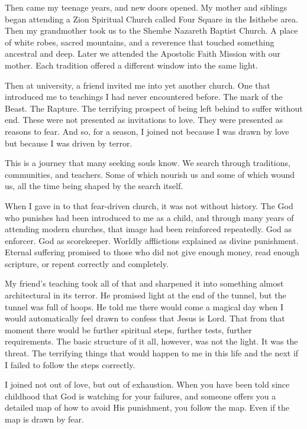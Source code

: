 Then came my teenage years, and new doors opened. My mother and siblings
began attending a Zion Spiritual Church called Four Square in the
Isithebe area. Then my grandmother took us to the Shembe Nazareth
Baptist Church. A place of white robes, sacred mountains, and a
reverence that touched something ancestral and deep. Later we attended
the Apostolic Faith Mission with our mother. Each tradition offered a
different window into the same light.

Then at university, a friend invited me into yet another church. One
that introduced me to teachings I had never encountered before. The mark
of the Beast. The Rapture. The terrifying prospect of being left behind
to suffer without end. These were not presented as invitations to love.
They were presented as reasons to fear. And so, for a season, I joined
not because I was drawn by love but because I was driven by terror.

This is a journey that many seeking souls know. We search through
traditions, communities, and teachers. Some of which nourish us and some
of which wound us, all the time being shaped by the search itself.

When I gave in to that fear-driven church, it was not without history.
The God who punishes had been introduced to me as a child, and through
many years of attending modern churches, that image had been reinforced
repeatedly. God as enforcer. God as scorekeeper. Worldly afflictions
explained as divine punishment. Eternal suffering promised to those who
did not give enough money, read enough scripture, or repent correctly
and completely.

My friend's teaching took all of that and sharpened it into something
almost architectural in its terror. He promised light at the end of the
tunnel, but the tunnel was full of hoops. He told me there would come a
magical day when I would automatically feel drawn to confess that Jesus
is Lord. That from that moment there would be further spiritual steps,
further tests, further requirements. The basic structure of it all,
however, was not the light. It was the threat. The terrifying things
that would happen to me in this life and the next if I failed to follow
the steps correctly.

I joined not out of love, but out of exhaustion. When you have been told
since childhood that God is watching for your failures, and someone
offers you a detailed map of how to avoid His punishment, you follow the
map. Even if the map is drawn by fear.

